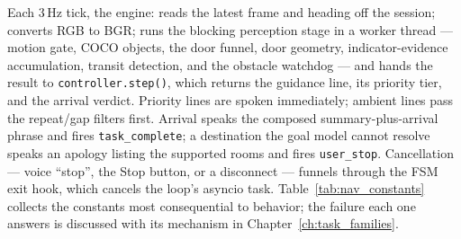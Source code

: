 Each 3\,Hz tick, the engine: reads the latest frame and heading off the session;
converts RGB to BGR; runs the blocking perception stage in a worker thread ---
motion gate, COCO objects, the door funnel, door geometry, indicator-evidence
accumulation, transit detection, and the obstacle watchdog --- and hands the
result to \texttt{controller.step()}, which returns the guidance line, its
priority tier, and the arrival verdict. Priority lines are spoken immediately;
ambient lines pass the repeat/gap filters first. Arrival speaks the composed
summary-plus-arrival phrase and fires \texttt{task\_complete}; a destination the
goal model cannot resolve speaks an apology listing the supported rooms and fires
\texttt{user\_stop}. Cancellation --- voice ``stop'', the Stop button, or a
disconnect --- funnels through the FSM exit hook, which cancels the loop's asyncio
task. Table~\ref{tab:nav_constants} collects the constants most consequential to
behavior; the failure each one answers is discussed with its mechanism in
Chapter~\ref{ch:task_families}.

